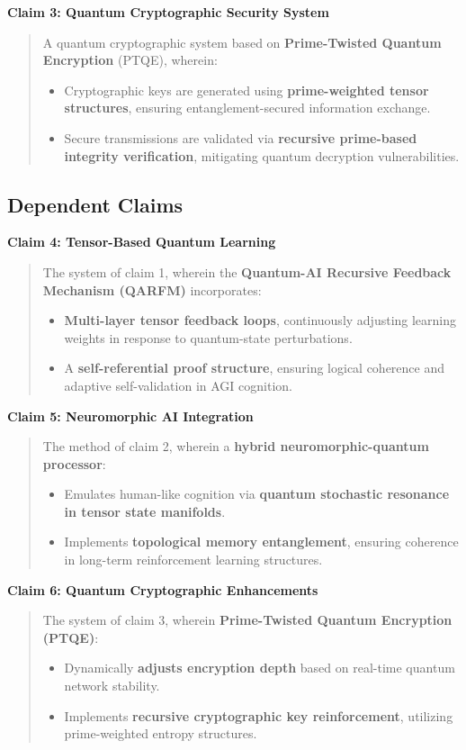 \documentclass{article}
\theoremstyle{plain}
\begin{document}
\textbf{Claim 3: Quantum Cryptographic Security System}
\begin{quote}
A quantum cryptographic system based on \textbf{Prime-Twisted Quantum Encryption} (PTQE), wherein:
\begin{itemize}
    \item Cryptographic keys are generated using \textbf{prime-weighted tensor structures}, ensuring entanglement-secured information exchange.
    \item Secure transmissions are validated via \textbf{recursive prime-based integrity verification}, mitigating quantum decryption vulnerabilities.
\end{itemize}
\end{quote}

\subsection{Dependent Claims}

\textbf{Claim 4: Tensor-Based Quantum Learning}
\begin{quote}
The system of claim 1, wherein the \textbf{Quantum-AI Recursive Feedback Mechanism (QARFM)} incorporates:
\begin{itemize}
    \item \textbf{Multi-layer tensor feedback loops}, continuously adjusting learning weights in response to quantum-state perturbations.
    \item A \textbf{self-referential proof structure}, ensuring logical coherence and adaptive self-validation in AGI cognition.
\end{itemize}
\end{quote}

\textbf{Claim 5: Neuromorphic AI Integration}
\begin{quote}
The method of claim 2, wherein a \textbf{hybrid neuromorphic-quantum processor}:
\begin{itemize}
    \item Emulates human-like cognition via \textbf{quantum stochastic resonance in tensor state manifolds}.
    \item Implements \textbf{topological memory entanglement}, ensuring coherence in long-term reinforcement learning structures.
\end{itemize}
\end{quote}

\textbf{Claim 6: Quantum Cryptographic Enhancements}
\begin{quote}
The system of claim 3, wherein \textbf{Prime-Twisted Quantum Encryption (PTQE)}:
\begin{itemize}
    \item Dynamically \textbf{adjusts encryption depth} based on real-time quantum network stability.
    \item Implements \textbf{recursive cryptographic key reinforcement}, utilizing prime-weighted entropy structures.
\end{itemize}
\end{quote}
\end{document}
